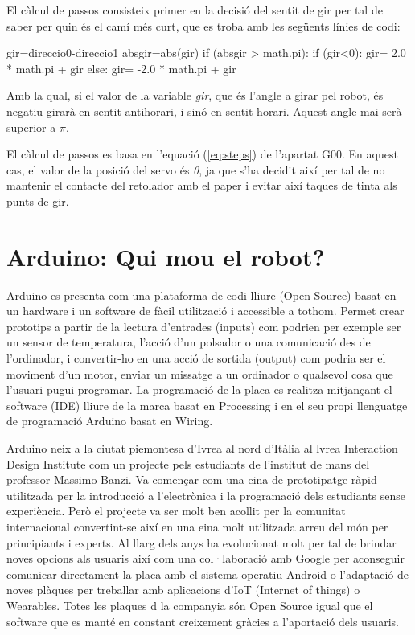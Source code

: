 El càlcul de passos consisteix primer en la decisió del sentit de gir per tal de saber per quin és el camí més curt, que es troba amb les següents línies de codi:
\begin{python}
	gir=direccio0-direccio1 
	absgir=abs(gir) 
	if (absgir > math.pi):
		if (gir<0):
			gir= 2.0 * math.pi + gir 
		else:
			gir= -2.0 * math.pi + gir
\end{python}
Amb la qual, si el valor de la variable \emph{gir}, que és l’angle a girar pel robot, és negatiu girarà en sentit antihorari, i sinó en sentit horari. Aquest angle mai serà superior a $\pi$. 

El càlcul de passos es basa en l’equació (\ref{eq:steps}) de l’apartat G00. En aquest cas, el valor de la posició del servo és \emph{0}, ja que s’ha decidit així per tal de no mantenir el contacte del retolador amb el paper i evitar així taques de tinta als punts de gir. 





\section{Arduino: Qui mou el robot?}

Arduino es presenta com una plataforma de codi lliure (Open-Source) basat en un hardware i un software de fàcil utilització i accessible a tothom.  Permet crear prototips a partir de la lectura d’entrades (inputs) com podrien per exemple ser un sensor de temperatura, l’acció d’un polsador o una comunicació des de l’ordinador, i convertir-ho en una acció de sortida (output) com podria ser el moviment d’un motor, enviar un missatge a un ordinador o qualsevol cosa que l’usuari pugui programar. La programació de la placa es realitza mitjançant el software (IDE) lliure de la marca basat en Processing i en el seu propi llenguatge de programació Arduino basat en Wiring. 

Arduino neix a la ciutat piemontesa d’Ivrea al nord d’Itàlia al lvrea Interaction Design Institute com un projecte pels estudiants de l’institut de mans del professor Massimo Banzi. Va començar com una eina de prototipatge ràpid utilitzada per la introducció a l’electrònica i la programació dels estudiants sense experiència. Però el projecte va ser molt ben acollit per la comunitat internacional convertint-se així en una eina molt utilitzada arreu del món per principiants i experts. Al llarg dels anys ha evolucionat molt per tal de brindar noves opcions als usuaris així com una col·laboració amb Google per aconseguir comunicar directament la placa amb el sistema operatiu Android o l’adaptació de noves plàques per treballar amb aplicacions d’IoT (Internet of things) o Wearables. Totes les plaques d la companyia són Open Source igual que el software que es manté en constant creixement gràcies a l’aportació dels usuaris. 

